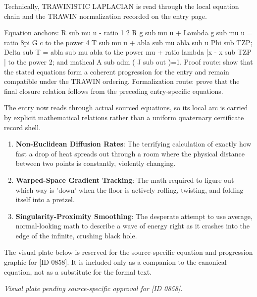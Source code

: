 Technically, TRAWINISTIC LAPLACIAN is read through the local equation chain and the TRAWIN normalization recorded on the entry page.

Equation anchors: R sub mu u - ratio 1 2 R g sub mu u + Lambda g sub mu u = ratio 8pi G c to the power 4 T sub mu u + abla sub mu abla sub u Phi sub TZP; Delta sub T = abla sub mu abla to the power mu + ratio lambda |x - x sub TZP | to the power 2; and mathcal A sub adm ( J sub out )=1. Proof route: show that the stated equations form a coherent progression for the entry and remain compatible under the TRAWIN ordering. Formalization route: prove that the final closure relation follows from the preceding entry-specific equations.

The entry now reads through actual sourced equations, so its local arc is carried by explicit mathematical relations rather than a uniform quaternary certificate record shell.
\endgroup

\begin{enumerate}[leftmargin=1.6em,itemsep=6pt,topsep=4pt]
\item \textbf{Non-Euclidean Diffusion Rates}: The terrifying calculation of exactly how fast a drop of heat spreads out through a room where the physical distance between two points is constantly, violently changing.
\item \textbf{Warped-Space Gradient Tracking}: The math required to figure out which way is 'down' when the floor is actively rolling, twisting, and folding itself into a pretzel.
\item \textbf{Singularity-Proximity Smoothing}: The desperate attempt to use average, normal-looking math to describe a wave of energy right as it crashes into the edge of the infinite, crushing black hole.
\end{enumerate}

\begingroup\footnotesize\sloppy
The visual plate below is reserved for the source-specific equation and progression graphic for [ID 0858]. It is included only as a companion to the canonical equation, not as a substitute for the formal text.
\par\endgroup
\begingroup\footnotesize\itshape
Visual plate pending source-specific approval for [ID 0858].
\par\endgroup

